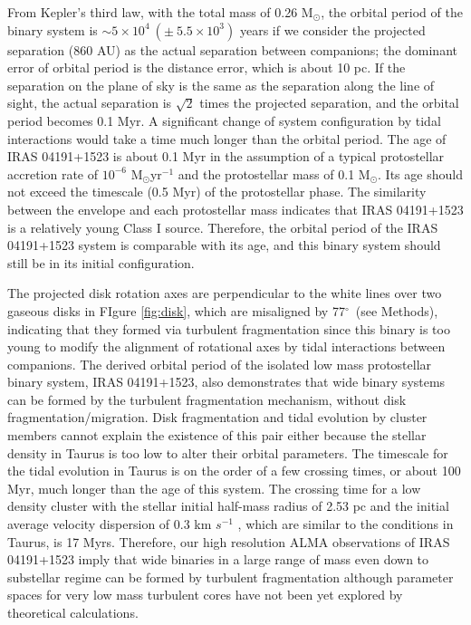 \documentclass{nature}
\newcommand{\msun}{\mbox{M$_\odot$}}%
\newcommand{\degree}{\mbox{$^\circ$}}
\begin{document}
From Kepler's third law, with the total mass of 0.26 \msun, 
the orbital period of the binary system is $\sim5\times 10^4~(\pm~5.5\times10^3)$ years 
if we consider the projected separation (860 AU) as the actual separation between companions; the dominant error of 
orbital period is the distance error, which is about 10 pc.
If the separation on the plane of sky is the same as the separation along the line of sight, 
the actual separation is $\sqrt2$ times the projected separation, and the orbital period becomes 0.1 Myr.
A significant change of system configuration by tidal interactions
would take a time much longer than the orbital period.
The age of IRAS 04191+1523 is about 0.1 Myr in the assumption of 
a typical protostellar accretion rate of $10^{-6}$ \msun yr$^{-1}$ and the protostellar mass of 0.1 \msun.
Its age should not exceed the timescale (0.5 Myr) of the protostellar phase\cite{Dunham2014}.
 The similarity between the envelope and each protostellar mass indicates that IRAS 04191+1523 is a relatively young 
Class I source\cite{Andre1999}. Therefore, the orbital period of the IRAS 04191+1523 system is comparable
with its age, and this binary system should still be in its initial configuration.

The projected disk rotation axes are perpendicular to the white lines over two gaseous disks in FIgure \ref{fig:disk}, 
which are misaligned by 77\degree\ (see Methods), indicating that they formed via turbulent fragmentation 
since this binary is too young to modify the alignment of rotational axes by tidal interactions between companions\cite{Offner2016}.
The derived orbital period of the isolated low mass protostellar binary system, IRAS 04191+1523, 
also demonstrates that wide binary systems can be formed by the turbulent fragmentation mechanism,
without disk fragmentation/migration.
Disk fragmentation and tidal evolution by cluster members cannot explain the existence of this pair either
because the stellar density in Taurus is too low\cite{Rebull2010} to alter their orbital parameters. 
The timescale for the tidal evolution in Taurus is on the order of  a few crossing times\cite{Marks2012}, 
or about 100 Myr, much longer than the age of this system. 
The crossing time for a low density cluster with the stellar initial half-mass radius of 2.53 pc 
and the initial average velocity dispersion of 0.3 km $s^{-1}$ , which are similar to the conditions in Taurus, 
is 17 Myrs\cite{Kroupa1995}.
Therefore, our high resolution ALMA observations of IRAS 04191+1523 imply that 
wide binaries in a large range of mass even down to substellar regime can be formed by turbulent fragmentation
 although parameter spaces for very low mass turbulent cores have not been yet explored by theoretical calculations\cite{Goodwin2004, Fisher2004, Offner2010}.
\clearpage
\end{document}
